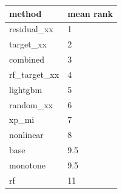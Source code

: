 \begin{tabular}{ll}
\toprule
method & mean rank \\
\midrule
residual\_xx & 1 \\
target\_xx & 2 \\
combined & 3 \\
rf\_target\_xx & 4 \\
lightgbm & 5 \\
random\_xx & 6 \\
xp\_mi & 7 \\
nonlinear & 8 \\
base & 9.5 \\
monotone & 9.5 \\
rf & 11 \\
\bottomrule
\end{tabular}
